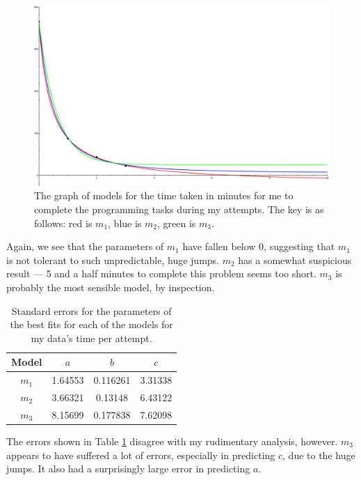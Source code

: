 \begin{figure}[ht!]
\centering
\includegraphics[scale=0.35,angle=90]{./media/MyTimesGraph.png}
\caption{The graph of models for the time taken in minutes for me to complete the programming tasks
	during my attempts. The key is as follows:
		 red is $m_1$,
		 blue is $m_2$,
		 green is $m_3$.
}
	\label{figure:mytimes:abc}
\end{figure}

Again, we see that the parameters of $m_1$ have fallen below 0, suggesting that
$m_1$ is not tolerant to such unpredictable, huge jumps.
$m_2$ has a somewhat suspicious result --- 5 and a half minutes to complete this
problem seems too short.
$m_3$ is probably the most sensible model, by inspection.

\begin{table}[ht!]
\centering
\begin{tabular}{|c|c|c|c|}
\hline
{\bf Model} &  $a$ & $b$ & $c$ \\
\hline
$m_1$ & 1.64553 & 0.116261 & 3.31338 \\
\hline
$m_2$ & 3.66321 & 0.13148 & 6.43122 \\
\hline
$m_3$ & 8.15699 & 0.177838 & 7.62098 \\
\hline
\end{tabular}
\caption{Standard errors for the parameters of the best fits for each of the
  models for my data's time per attempt.}
\label{table:mytimes:abc:error}
\end{table}

The errors shown in Table \ref{table:mytimes:abc:error} disagree with my
rudimentary analysis, however.
$m_3$ appears to have suffered a lot of errors, especially in predicting $c$,
due to the huge jumps.
It also had a surprisingly large error in predicting $a$.

